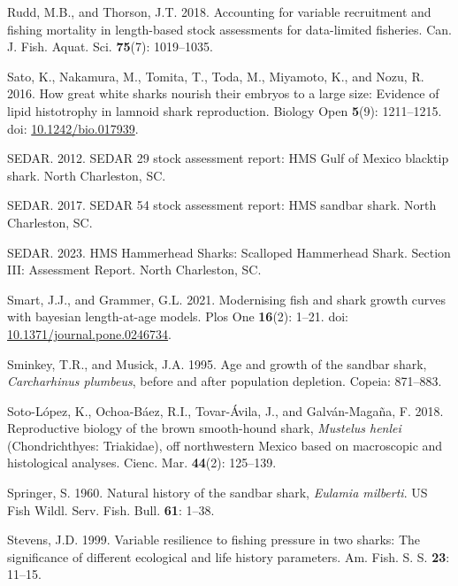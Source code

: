 \documentclass[
]{article}
\newenvironment{CSLReferences}%
  {}%
  {\par}
\begin{document}
\begin{CSLReferences}{1}{0}
Rudd, M.B., and Thorson, J.T. 2018. Accounting for variable recruitment and fishing mortality in length-based stock assessments for data-limited fisheries. Can. J. Fish. Aquat. Sci. \textbf{75}(7): 1019--1035.

Sato, K., Nakamura, M., Tomita, T., Toda, M., Miyamoto, K., and Nozu, R. 2016. How great white sharks nourish their embryos to a large size: Evidence of lipid histotrophy in lamnoid shark reproduction. Biology Open \textbf{5}(9): 1211--1215. doi: \href{https://doi.org/10.1242/bio.017939}{10.1242/bio.017939}.

SEDAR. 2012. {SEDAR} 29 stock assessment report: {HMS} {Gulf} of {Mexico} blacktip shark. North Charleston, SC.

SEDAR. 2017. {SEDAR} 54 stock assessment report: {HMS} sandbar shark. North Charleston, SC.

SEDAR. 2023. {HMS} {Hammerhead} {Sharks}: {Scalloped} {Hammerhead} {Shark}. {Section} {III}: {Assessment} {Report}. North Charleston, SC.

Smart, J.J., and Grammer, G.L. 2021. Modernising fish and shark growth curves with bayesian length-at-age models. Plos One \textbf{16}(2): 1--21. doi: \href{https://doi.org/10.1371/journal.pone.0246734}{10.1371/journal.pone.0246734}.

Sminkey, T.R., and Musick, J.A. 1995. Age and growth of the sandbar shark, \emph{{Carcharhinus} plumbeus}, before and after population depletion. Copeia: 871--883.

Soto-López, K., Ochoa-Báez, R.I., Tovar-Ávila, J., and Galván-Magaña, F. 2018. Reproductive biology of the brown smooth-hound shark, \emph{{Mustelus} henlei} ({Chondrichthyes}: {Triakidae}), off northwestern {Mexico} based on macroscopic and histological analyses. Cienc. Mar. \textbf{44}(2): 125--139.

Springer, S. 1960. Natural history of the sandbar shark, \emph{{Eulamia} milberti}. US Fish Wildl. Serv. Fish. Bull. \textbf{61}: 1--38.

Stevens, J.D. 1999. Variable resilience to fishing pressure in two sharks: The significance of different ecological and life history parameters. Am. Fish. S. S. \textbf{23}: 11--15.


\end{CSLReferences}
\end{document}
